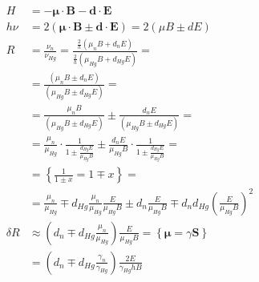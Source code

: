 \begin{align}
H &= - \boldsymbol{\mu} \cdot \mathbf{B} - \mathbf{d} \cdot \mathbf{E} \\
h \nu &= 2 \left( \boldsymbol{\mu} \cdot \mathbf{B} \pm \mathbf{d} \cdot \mathbf{E} \right) = 2 \left(\mu B \pm d E \right) \\
R &= \frac{\nu_n}{\nu_{Hg}} = \frac{ \frac{2}{h} \left( \mu_n B + d_n E \right) }{ \frac{2}{h} \left( \mu_{Hg} B + d_{Hg} E \right) } = \nonumber \\
    &= \frac{ \left( \mu_n B \pm d_n E \right) }{ \left( \mu_{Hg} B \pm d_{Hg} E \right) } = \nonumber \\
    &= \frac{ \mu_n B }{ \left( \mu_{Hg} B \pm d_{Hg} E \right) } \pm \frac{ d_n E }{ \left( \mu_{Hg} B \pm d_{Hg} E \right) } = \nonumber \\
    &= \frac{\mu_n}{\mu_{Hg}} \cdot \frac{1}{ 1 \pm \frac{d_{Hg} E}{\mu_{Hg} B}} \pm \frac{d_n E}{\mu_{Hg} B} \cdot \frac{1}{1 \pm \frac{ d_{Hg}E }{ \mu_{Hg} B}} = \nonumber \\
    &= \left\{ \frac{1}{1 \pm x} = 1 \mp x \right\} = \nonumber \\
    &= \frac{\mu_n}{\mu_{Hg}} \mp d_{Hg} \frac{\mu_n}{\mu_{Hg}} \frac{E}{\mu_{Hg} B} \pm d_n \frac{E}{\mu_{Hg} B} \mp d_n d_{Hg} \left( \frac{E}{\mu_{Hg} B} \right)^2 \\
\delta R &\approx \left( d_n \mp  d_{Hg} \frac{\mu_n}{\mu_{Hg}} \right) \frac{E}{\mu_{Hg} B} = \left\{ \boldsymbol{\mu} = \gamma \mathbf{S} \right\} \nonumber \\
   & = \left( d_n \mp  d_{Hg} \frac{\gamma_n}{\gamma_{Hg}} \right) \frac{2 E}{\gamma_{Hg} h B}
\end{align}

